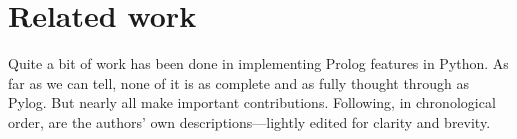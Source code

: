 
\section{Related work}\label{sec:related_work}

Quite a bit of work has been done in implementing Prolog features in Python. As far as we can tell, none of it is as complete and as fully thought through as Pylog. But nearly all make important contributions. Following, in chronological order, are the authors' own descriptions---lightly edited for clarity and brevity.

